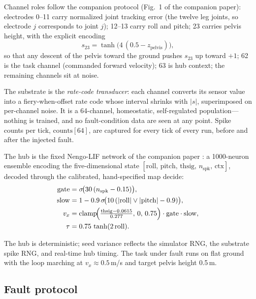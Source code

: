 Channel roles follow the companion protocol (Fig.~1 of the companion paper):
electrodes 0--11 carry normalized joint tracking error (the twelve leg joints,
so electrode $j$ corresponds to joint $j$); 12--13 carry roll and pitch; 23
carries pelvis height, with the explicit encoding
\begin{equation}
s_{23} = \tanh\!\bigl(4\,(0.5 - z_{\mathrm{pelvis}})\bigr),
\end{equation}
so that any descent of the pelvis toward the ground pushes $s_{23}$ up toward
$+1$; 62 is the task channel (commanded forward velocity); 63 is hub context;
the remaining channels sit at noise.

The substrate is the \emph{rate-code transducer}: each channel converts its
sensor value into a fiery-when-offset rate code whose interval shrinks with
$|s|$, superimposed on per-channel noise. It is a 64-channel, homeostatic,
self-regulated population---nothing is trained, and no fault-condition data are
seen at any point. Spike counts per tick, $\mathrm{counts}[64]$, are captured
for every tick of every run, before and after the injected fault.

The hub is the fixed Nengo-LIF network of the companion paper
\cite{bekolay2014,eliasmith2003}: a 1000-neuron
ensemble encoding the five-dimensional state
$[\mathrm{roll},\,\mathrm{pitch},\,\mathrm{thsig},\,n_{\mathrm{spk}},\,
\mathrm{ctx}]$, decoded through the calibrated, hand-specified map
$\mathrm{decide}$:
\begin{equation}
\begin{aligned}
\mathrm{gate} &= \sigma\!\bigl(30\,(n_{\mathrm{spk}} - 0.15)\bigr),\\
\mathrm{slow} &= 1 - 0.9\,\sigma\!\bigl(10\,(\lvert\mathrm{roll}\rvert \vee
\lvert\mathrm{pitch}\rvert - 0.9)\bigr),\\
v_x &= \mathrm{clamp}\!\Bigl(\tfrac{\mathrm{thsig} - 0.0615}{0.277},\,0,\,0.75
\Bigr)\cdot \mathrm{gate}\cdot \mathrm{slow},\\
\tau &= 0.75\,\tanh(2\,\mathrm{roll}).
\end{aligned}
\end{equation}

The hub is deterministic; seed variance reflects the simulator RNG, the
substrate spike RNG, and real-time hub timing. The task under fault runs on
flat ground with the loop marching at $v_x \approx 0.5$\,m/s and target pelvis
height 0.5\,m.

\subsection{Fault protocol}

